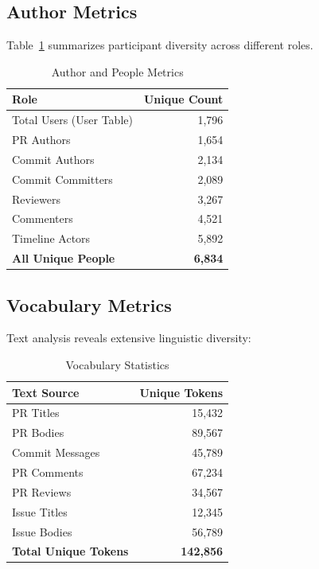 \documentclass[11pt]{article}
\begin{document}
\subsection{Author Metrics}

Table~\ref{tab:author_metrics} summarizes participant diversity across different roles.

\begin{table}[H]
\centering
\caption{Author and People Metrics}
\label{tab:author_metrics}
\begin{tabular}{@{}lr@{}}
\toprule
\textbf{Role} & \textbf{Unique Count} \\
\midrule
Total Users (User Table) & 1,796 \\
PR Authors & 1,654 \\
Commit Authors & 2,134 \\
Commit Committers & 2,089 \\
Reviewers & 3,267 \\
Commenters & 4,521 \\
Timeline Actors & 5,892 \\
\midrule
\textbf{All Unique People} & \textbf{6,834} \\
\bottomrule
\end{tabular}
\end{table}

\subsection{Vocabulary Metrics}

Text analysis reveals extensive linguistic diversity:

\begin{table}[H]
\centering
\caption{Vocabulary Statistics}
\label{tab:vocab}
\begin{tabular}{@{}lr@{}}
\toprule
\textbf{Text Source} & \textbf{Unique Tokens} \\
\midrule
PR Titles & 15,432 \\
PR Bodies & 89,567 \\
Commit Messages & 45,789 \\
PR Comments & 67,234 \\
PR Reviews & 34,567 \\
Issue Titles & 12,345 \\
Issue Bodies & 56,789 \\
\midrule
\textbf{Total Unique Tokens} & \textbf{142,856} \\
\bottomrule
\end{tabular}
\end{table}
\end{document}
